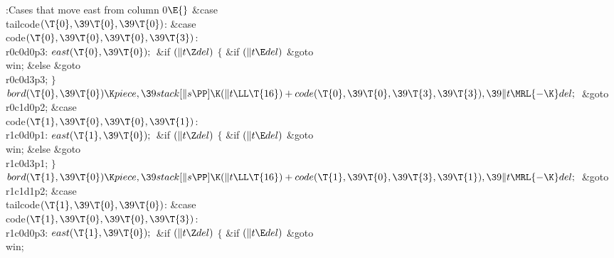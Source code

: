 \B{}:Cases that move east from column 0\X${}\E{}$\6
\4\&{case} \\{tailcode}${}(\T{0},\39\T{0},\39\T{0}){}$:\5
\&{case} \\{code}${}(\T{0},\39\T{0},\39\T{0},\39\T{3}){}$:\5
\\{r0c0d0p3}:\5
${}\\{east}(\T{0},\39\T{0});{}$\6
\&{if} ${}(\|t\Z\\{del}){}$\5
${}\{{}$\5
\1\&{if} ${}(\|t\E\\{del}){}$\1\5
\&{goto} \\{win};\5
\2\&{else}\1\5
\&{goto} \\{r0c0d3p3};\5
\2${}\}{}$\2\6
${}\\{bord}(\T{0},\39\T{0})\K\\{piece},\39\\{stack}[\|s\PP]\K(\|t\LL\T{16})+%
\\{code}(\T{0},\39\T{0},\39\T{3},\39\T{3}),\39\|t\MRL{-{\K}}\\{del};{}$\6
\&{goto} \\{r0c1d0p2};\6
\4\&{case} \\{code}${}(\T{1},\39\T{0},\39\T{0},\39\T{1}){}$:\5
\\{r1c0d0p1}:\5
${}\\{east}(\T{1},\39\T{0});{}$\6
\&{if} ${}(\|t\Z\\{del}){}$\5
${}\{{}$\5
\1\&{if} ${}(\|t\E\\{del}){}$\1\5
\&{goto} \\{win};\5
\2\&{else}\1\5
\&{goto} \\{r1c0d3p1};\5
\2${}\}{}$\2\6
${}\\{bord}(\T{1},\39\T{0})\K\\{piece},\39\\{stack}[\|s\PP]\K(\|t\LL\T{16})+%
\\{code}(\T{1},\39\T{0},\39\T{3},\39\T{1}),\39\|t\MRL{-{\K}}\\{del};{}$\6
\&{goto} \\{r1c1d1p2};\6
\4\&{case} \\{tailcode}${}(\T{1},\39\T{0},\39\T{0}){}$:\5
\&{case} \\{code}${}(\T{1},\39\T{0},\39\T{0},\39\T{3}){}$:\5
\\{r1c0d0p3}:\5
${}\\{east}(\T{1},\39\T{0});{}$\6
\&{if} ${}(\|t\Z\\{del}){}$\5
${}\{{}$\5
\1\&{if} ${}(\|t\E\\{del}){}$\1\5
\&{goto} \\{win};\5
